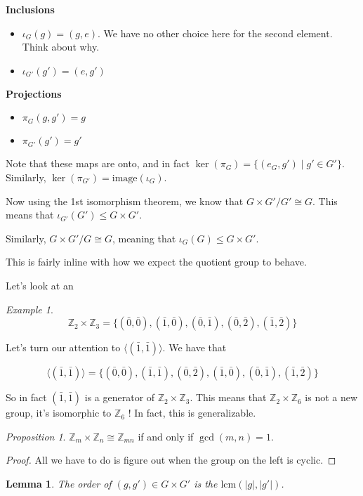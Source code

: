 \documentclass[12pt]{article}
\def\lcm{\text{lcm}}
\def\image{\text{image}}
\def\Z{{\mathbb Z}}
\newcommand{\lr}[1]{\langle #1 \rangle}
\newtheorem{lemma}[theorem]{Lemma} %
\theoremstyle{remark}
\newtheorem{proposition}{Proposition}
\theoremstyle{remark}
\theoremstyle{remark}
\newtheorem{example}{Example}
\theoremstyle{remark}
\theoremstyle{remark}
\begin{document}
{\bf Inclusions}
\begin{itemize}
  \item $\iota_G(g) = (g, e)$. We have no other choice here for the second
    element. Think about why.
  \item $\iota_{G'}(g') = (e, g')$
\end{itemize}

{\bf Projections}
\begin{itemize}
  \item $\pi_G(g, g') = g$
  \item $\pi_{G'}(g') = g'$
\end{itemize}

Note that these maps are onto, and in fact $\ker(\pi_G) = \{ (e_{G}, g') \mid g'
\in G' \}$. Similarly, $\ker(\pi_{G'}) = \image(\iota_G)$.

Now using the 1st isomorphism theorem, we know that $G \times G' / G' \cong G$.
This means that $\iota_{G'}(G') \le G \times G'$.

Similarly, $G \times G' / G \cong G$, meaning that $\iota_G(G) \le G \times G'$.

This is fairly inline with how we expect the quotient group to behave.

Let's look at an

\begin{example}
  \[
    \Z_2 \times \Z_3 = \{ (\bar 0, \bar 0), (\bar 1, \bar 0), (\bar 0, \bar 1),
    (\bar 0, \bar 2), (\bar 1, \bar 2) \}
  \]
\end{example}

Let's turn our attention to $\lr { (\bar 1, \bar 1) }$. We have that

\[
  \lr { (\bar 1, \bar 1) } = \{ (\bar 0, \bar 0), (\bar 1, \bar 1), (\bar 0, \bar
  2), (\bar 1, \bar 0), (\bar 0, \bar 1), (\bar 1, \bar 2) \}
\]

So in fact $(\bar 1, \bar 1)$ is a generator of $\Z_2 \times \Z_3$. This means
that $\Z_2 \times \Z_6$ is not a new group, it's isomorphic to $\Z_6$ ! In fact,
this is generalizable.

\begin{proposition}
  $\Z_m \times \Z_n \cong \Z_{mn}$ if and only if $\gcd(m, n) = 1$.
\end{proposition}

\begin{proof}
  All we have to do is figure out when the group on the left is cyclic.
\end{proof}

\begin{lemma}
  The order of $(g, g') \in G \times G'$ is the $\lcm(|g|, |g'|)$.
\end{lemma}
\end{document}
